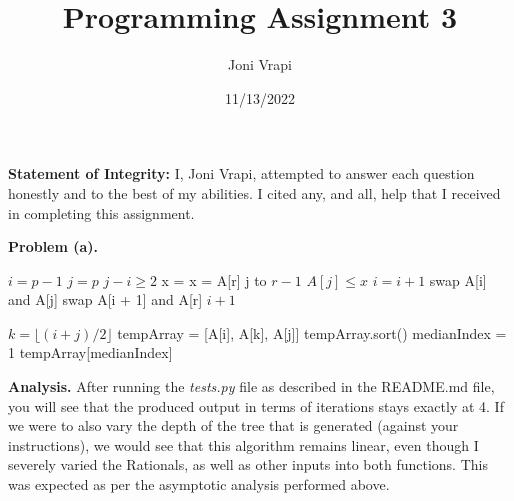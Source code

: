 \documentclass{article}
\title{Programming Assignment 3}
\author{Joni Vrapi}
\date{11/13/2022}
\begin{document}
\maketitle

\textbf{Statement of Integrity:} I, Joni Vrapi, attempted to answer each question honestly and to the best of my abilities. I cited any, and all, help that I received in completing this assignment.

\hfill

\textbf{Problem (a).} 

\begin{codebox}
    \li $i = p - 1$
    \li $j = p$
    \li
    \li \If $j - i \geq 2$ \Then
    \li x = 
    \li \Else
    \li x = A[r] \End
    \li
    \li \For j to $r - 1$ \Do
    \li \If $A[j] \leq x$ \Then
    \li $i = i + 1$
    \li swap A[i] and A[j] \End \End
    \li
    \li swap A[i + 1] and A[r]
    \li
    \li \Return $i + 1$
\end{codebox}

\begin{codebox}
    \li $k = \lfloor (i + j)/2 \rfloor$
    \li
    \li tempArray = [A[i], A[k], A[j]]
    \li tempArray.sort()
    \li
    \li medianIndex = 1
    \li
    \li \Return tempArray[medianIndex]
\end{codebox}

\hfill

\textbf{Analysis.} After running the \emph{tests.py} file as described in the README.md file, you will see that the produced output in terms of iterations stays exactly at 4. If we were to also vary the depth of the tree that is generated (against your instructions), we would see that this algorithm remains linear, even though I severely varied the Rationals, as well as other inputs into both functions. This was expected as per the asymptotic analysis performed above. 

\newpage
 

\end{document}
